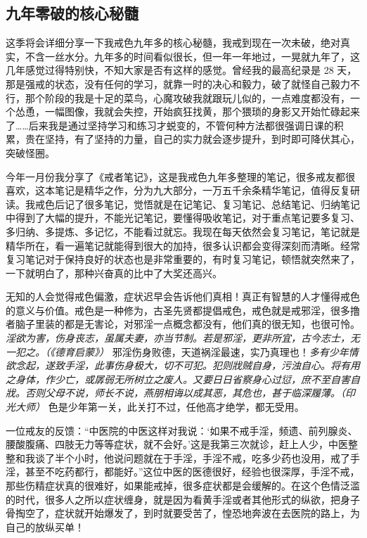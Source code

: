 \subsection{九年零破的核心秘髓}

这季将会详细分享一下我戒色九年多的核心秘髓，我戒到现在一次未破，绝对真实，不含一丝水分。九年多的时间看似很长，但一年一年地过，一晃就九年了，这几年感觉过得特别快，不知大家是否有这样的感觉。曾经我的最高纪录是 28 天，那是强戒的状态，没有任何的学习，就靠一时的决心和毅力，破了就怪自己毅力不行，那个阶段的我是十足的菜鸟，心魔攻破我就跟玩儿似的，一点难度都没有，一个怂恿，一幅图像，我就会失控，开始疯狂找黄，那个猥琐的身影又开始忙碌起来了……后来我是通过坚持学习和练习才蜕变的，不管何种方法都很强调日课的积累，贵在坚持，有了坚持的力量，自己的实力就会逐步提升，到时即可降伏其心，突破怪圈。

今年一月份我分享了《戒者笔记》，这是我戒色九年多整理的笔记，很多戒友都很喜欢，这本笔记是精华之作，分为九大部分，一万五千余条精华笔记，值得反复研读。我戒色后记了很多笔记，觉悟就是在记笔记、复习笔记、总结笔记、归纳笔记中得到了大幅的提升，不能光记笔记，要懂得吸收笔记，对于重点笔记要多复习、多归纳、多提炼、多记忆，不能看过就忘。我现在每天依然会复习笔记，笔记就是精华所在，看一遍笔记就能得到很大的加持，很多认识都会变得深刻而清晰。经常复习笔记对于保持良好的状态也是非常重要的，有时复习笔记，顿悟就突然来了，一下就明白了，那种兴奋真的比中了大奖还高兴。

无知的人会觉得戒色偏激，症状迟早会告诉他们真相！真正有智慧的人才懂得戒色的意义与价值。戒色是一种修为，古圣先贤都提倡戒色，戒色就是戒邪淫，很多撸者脑子里装的都是无害论，对邪淫一点概念都没有，他们真的很无知，也很可怜。\textit{淫欲为害，伤身丧志，虽属夫妻，亦当节制。若是邪淫，更非所宜，古今志士，无一犯之。（《德育启蒙》）} 邪淫伤身败德，天道祸淫最速，实乃真理也！\textit{多有少年情欲念起，遂致手淫，此事伤身极大，切不可犯。犯则戕贼自身，污浊自心。将有用之身体，作少亡，或孱弱无所树立之废人。又要日日省察身心过愆，庶不至自害自戕。否则父母不说，师长不说，燕朋相诲以成其恶，其危也，甚于临深履薄。（印光大师）} 色是少年第一关，此关打不过，任他高才绝学，都无受用。

一位戒友的反馈：“中医院的中医这样对我说：‘如果不戒手淫，频遗、前列腺炎、腰酸腹痛、四肢无力等等症状，就不会好。’这是我第三次就诊，赶上人少，中医整整和我谈了半个小时，他说问题就在于手淫，手淫不戒，吃多少药也没用，戒了手淫，甚至不吃药都行，都能好。”这位中医的医德很好，经验也很深厚，手淫不戒，那些伤精症状真的很难好，如果能戒掉，很多症状都是会缓解的。在这个色情泛滥的时代，很多人之所以症状缠身，就是因为看黄手淫或者其他形式的纵欲，把身子骨掏空了，症状就开始爆发了，到时就要受苦了，惶恐地奔波在去医院的路上，为自己的放纵买单！


